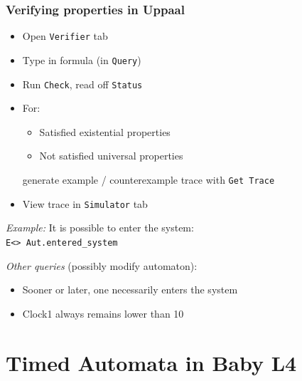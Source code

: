 \documentclass{beamer}
\begin{document}
\begin{frame}[fragile]\frametitle{Verifying properties in Uppaal}

  \begin{itemize}
  \item Open \texttt{Verifier} tab
  \item Type in formula (in \texttt{Query})
  \item Run \texttt{Check}, read off \texttt{Status}
  \item For:
    \begin{itemize}
    \item Satisfied existential properties
    \item Not satisfied universal properties
    \end{itemize}
    generate example / counterexample trace with \texttt{Get Trace}
  \item View trace in \texttt{Simulator} tab
  \end{itemize}

  \vspace{3mm}
  \emph{Example:} It is possible to enter the system:\\
  \texttt{E<> Aut.entered\_system}

  \vspace{3mm}
  \emph{Other queries} (possibly modify automaton):
  \begin{itemize}
  \item Sooner or later, one necessarily enters the system
  \item Clock1 always remains lower than 10
  \end{itemize}


\end{frame}





\section{Timed Automata in Baby L4}
\end{document}
